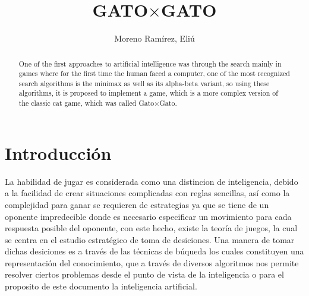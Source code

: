\documentclass[runningheads]{llncs}
\begin{document}
%
\title{GATO$\times$GATO}
%
%
\author{Moreno Ramírez, Eliú}
%
%
%
\maketitle              %
%
\begin{abstract}
One of the first approaches to artificial intelligence was through the search mainly in games where for the first time the human faced a computer, one of the most recognized search algorithms is the minimax as well as its alpha-beta variant, so using these algorithms, it is proposed to implement a game, which is a more complex version of the classic cat game, which was called Gato$\times$Gato.

\end{abstract}
%
%
%
\section{Introducción}
La habilidad de jugar es considerada como una distincion de inteligencia, debido a la facilidad de crear situaciones complicadas con reglas sencillas, así como la complejidad para ganar se requieren de estrategias ya que se tiene de un oponente impredecible donde es necesario especificar un movimiento para cada respuesta posible del oponente, con este hecho, existe la teoría de juegos, la cual se centra en el estudio estratégico de toma de desiciones. Una manera de tomar dichas desiciones es a través de las técnicas de búqueda los cuales constituyen una representación del conocimiento, que a través de diversos algoritmos nos permite resolver ciertos problemas desde el punto de vista de la inteligencia o para el proposito de este documento la inteligencia artificial. 
\end{document}

